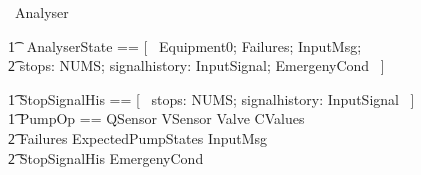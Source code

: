 \documentclass{report} %
\begin{document}
\begin{circus}
   \circprocess\ Analyser \circdef\ \circbegin \\
\end{circus}
\begin{circusaction}
   \t1 \circstate\ AnalyserState == [~ Equipment0; Failures; InputMsg; \\ 
       \t2 stops: NUMS; signalhistory: \power InputSignal; EmergenyCond ~] \\
\end{circusaction}
\begin{zed}
    \t1 StopSignalHis == [~ stops: NUMS; signalhistory: \power InputSignal ~] \\ %
    \t1 PumpOp == \Xi QSensor \land \Xi VSensor \land \Xi Valve \land \Xi CValues \land \\
        \t2 \Xi Failures \land \Xi ExpectedPumpStates \land \Xi InputMsg \land \\
        \t2 \Xi StopSignalHis \land \Xi EmergenyCond \\ %
\end{zed}
\end{document}
